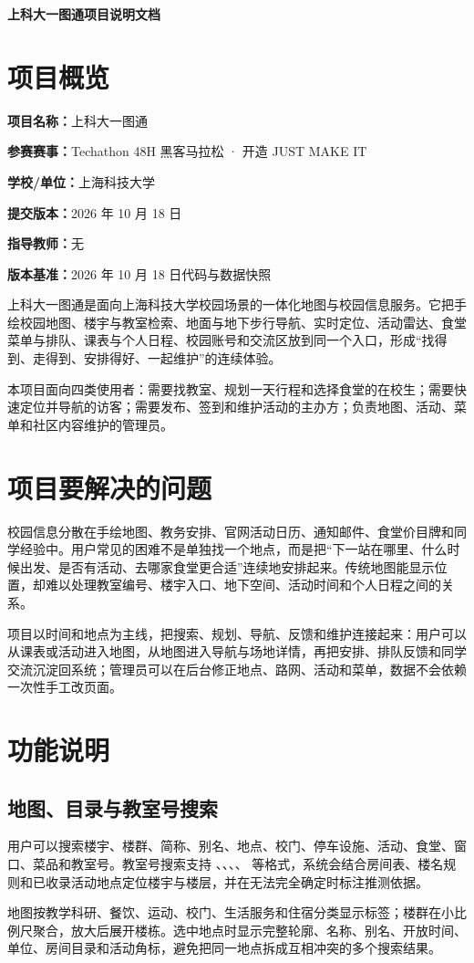 \documentclass[UTF8,a4paper,12pt]{ctexart}
\begin{document}
\begin{center}\Huge\bfseries\color{ShanghaiBlue}上科大一图通项目说明文档\end{center}
\vspace{0.8em}
\section{项目概览}
\textbf{项目名称：}上科大一图通\par
\textbf{参赛赛事：}Techathon 48H 黑客马拉松 · 开造 JUST MAKE IT\par
\textbf{学校/单位：}上海科技大学\par
\textbf{提交版本：}2026 年 10 月 18 日\par
\textbf{指导教师：}无\par
\textbf{版本基准：}2026 年 10 月 18 日代码与数据快照\par
上科大一图通是面向上海科技大学校园场景的一体化地图与校园信息服务。它把手绘校园地图、楼宇与教室检索、地面与地下步行导航、实时定位、活动雷达、食堂菜单与排队、课表与个人日程、校园账号和交流区放到同一个入口，形成“找得到、走得到、安排得好、一起维护”的连续体验。\par
本项目面向四类使用者：需要找教室、规划一天行程和选择食堂的在校生；需要快速定位并导航的访客；需要发布、签到和维护活动的主办方；负责地图、活动、菜单和社区内容维护的管理员。\par
\section{项目要解决的问题}
校园信息分散在手绘地图、教务安排、官网活动日历、通知邮件、食堂价目牌和同学经验中。用户常见的困难不是单独找一个地点，而是把“下一站在哪里、什么时候出发、是否有活动、去哪家食堂更合适”连续地安排起来。传统地图能显示位置，却难以处理教室编号、楼宇入口、地下空间、活动时间和个人日程之间的关系。\par
项目以时间和地点为主线，把搜索、规划、导航、反馈和维护连接起来：用户可以从课表或活动进入地图，从地图进入导航与场地详情，再把安排、排队反馈和同学交流沉淀回系统；管理员可以在后台修正地点、路网、活动和菜单，数据不会依赖一次性手工改页面。\par
\section{功能说明}
\subsection{地图、目录与教室号搜索}
用户可以搜索楼宇、楼群、简称、别名、地点、校门、停车设施、活动、食堂、窗口、菜品和教室号。教室号搜索支持 \texttt{}、\texttt{}、\texttt{}、\texttt{}、\texttt{} 等格式，系统会结合房间表、楼名规则和已收录活动地点定位楼宇与楼层，并在无法完全确定时标注推测依据。\par
地图按教学科研、餐饮、运动、校门、生活服务和住宿分类显示标签；楼群在小比例尺聚合，放大后展开楼栋。选中地点时显示完整轮廓、名称、别名、开放时间、单位、房间目录和活动角标，避免把同一地点拆成互相冲突的多个搜索结果。\par
\end{document}
